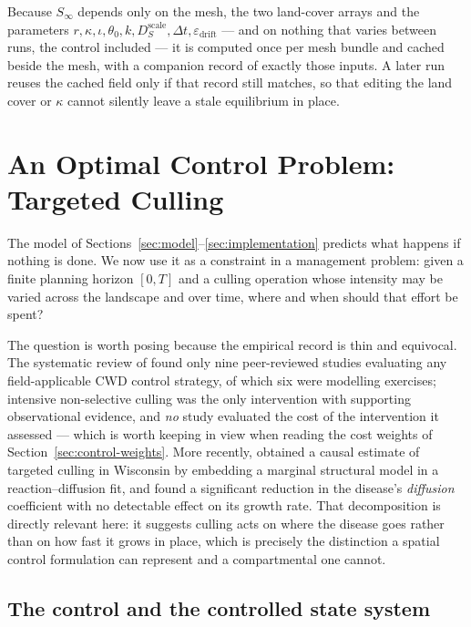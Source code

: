 \documentclass[11pt]{article}
\begin{document}
Because $S_\infty$ depends only on the mesh, the two land-cover arrays and the parameters $r,\kappa,\iota,\theta_0,k,D_S^{\text{scale}},\Delta t,\varepsilon_{\text{drift}}$ --- and on nothing that varies between runs, the control included --- it is computed once per mesh bundle and cached beside the mesh, with a companion record of exactly those inputs. A later run reuses the cached field only if that record still matches, so that editing the land cover or $\kappa$ cannot silently leave a stale equilibrium in place.

\section{An Optimal Control Problem: Targeted Culling}
\label{sec:control}

The model of Sections~\ref{sec:model}--\ref{sec:implementation} predicts what happens if nothing is done. We now use it as a constraint in a management problem: given a finite planning horizon $[0,T]$ and a culling operation whose intensity may be varied across the landscape and over time, where and when should that effort be spent?

The question is worth posing because the empirical record is thin and equivocal. The systematic review of \citet{Uehlinger2016} found only nine peer-reviewed studies evaluating any field-applicable CWD control strategy, of which six were modelling exercises; intensive non-selective culling was the only intervention with supporting observational evidence, and \emph{no} study evaluated the cost of the intervention it assessed --- which is worth keeping in view when reading the cost weights of Section~\ref{sec:control-weights}. More recently, \citet{MandujanoReyes2025} obtained a causal estimate of targeted culling in Wisconsin by embedding a marginal structural model in a reaction--diffusion fit, and found a significant reduction in the disease's \emph{diffusion} coefficient with no detectable effect on its growth rate. That decomposition is directly relevant here: it suggests culling acts on where the disease goes rather than on how fast it grows in place, which is precisely the distinction a spatial control formulation can represent and a compartmental one cannot.

\subsection{The control and the controlled state system}
\end{document}

